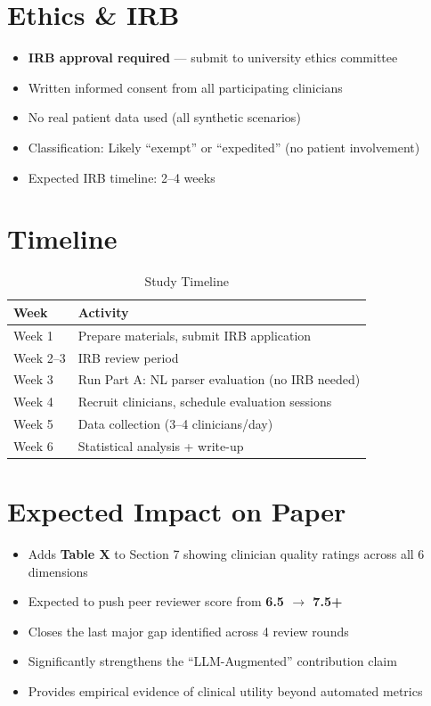 \documentclass[runningheads,a4paper]{llncs}
\begin{document}
\section{Ethics \& IRB}

\begin{itemize}[leftmargin=*]
  \item \textbf{IRB approval required} --- submit to university ethics committee
  \item Written informed consent from all participating clinicians
  \item No real patient data used (all synthetic scenarios)
  \item Classification: Likely ``exempt'' or ``expedited'' (no patient involvement)
  \item Expected IRB timeline: 2--4 weeks
\end{itemize}

\section{Timeline}

\begin{table}[h]
\centering
\caption{Study Timeline}
\begin{tabular}{ll}
\toprule
\textbf{Week} & \textbf{Activity} \\
\midrule
Week 1   & Prepare materials, submit IRB application \\
Week 2--3 & IRB review period \\
Week 3   & Run Part A: NL parser evaluation (no IRB needed) \\
Week 4   & Recruit clinicians, schedule evaluation sessions \\
Week 5   & Data collection (3--4 clinicians/day) \\
Week 6   & Statistical analysis + write-up \\
\bottomrule
\end{tabular}
\end{table}

\section{Expected Impact on Paper}

\begin{itemize}[leftmargin=*]
  \item Adds \textbf{Table X} to Section 7 showing clinician quality ratings across all 6 dimensions
  \item Expected to push peer reviewer score from \textbf{6.5 $\to$ 7.5+}
  \item Closes the last major gap identified across 4 review rounds
  \item Significantly strengthens the ``LLM-Augmented'' contribution claim
  \item Provides empirical evidence of clinical utility beyond automated metrics
\end{itemize}
\end{document}
